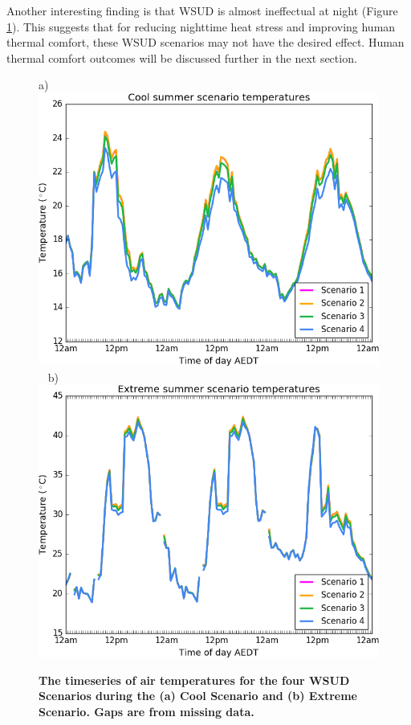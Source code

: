 \documentclass[final,3p,times,authoryear]{elsarticle}
\begin{document}
Another interesting finding is that WSUD is almost ineffectual at night (Figure \ref{fig:timeseries_scenarios}). This suggests that for reducing nighttime heat stress and improving human thermal comfort, these WSUD scenarios may not have the desired effect. Human thermal comfort outcomes will be discussed further in the next section.

\begin{figure}[!htbp]
\centering   
a)\includegraphics[scale=0.40]{images/fig3a}
~
b)\includegraphics[scale=0.40]{images/fig3b} 
\caption{\bf The timeseries of air temperatures for the four WSUD Scenarios during the (a) Cool Scenario and (b) Extreme Scenario. Gaps are from missing data.}    
 \label{fig:timeseries_scenarios} 
\end{figure} 
\end{document}
